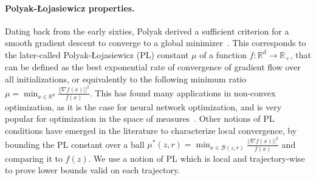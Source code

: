 \paragraph{Polyak-Łojasiewicz properties.} Dating back from the early sixties, Polyak derived a sufficient criterion for a smooth gradient descent to converge to a global minimizer~\citep{Polyak1964}. This corresponds to the later-called Polyak-Łojasiewicz (PL) constant $\mu$ of a function $f:\mathbb{R}^d\rightarrow\mathbb{R}_+$, that  can be defined as the best exponential rate of convergence of gradient flow over all initializations, or equivalently to the following minimum ratio $\mu = \min_{x\in\mathbb{R}^d}\frac{||\nabla f(x)||^2}{f(x)}$. This has found many applications in non-convex optimization, as it is the case for neural network optimization, and is very popular for optimization in the space of measures~\citep{gentil2020entropie}. Other notions of PL conditions have emerged in the literature to characterize local convergence, by bounding the PL constant over a ball $\mu^*(z,r) = \min_{x\in\mathcal{B}(z,r)}\frac{||\nabla f(x)||^2}{f(x)}$ \citep{chatterjee2022convergence, liu2022loss} and comparing it to $f(z)$. We use a notion of PL which is local and trajectory-wise to prove lower bounds valid on each trajectory.